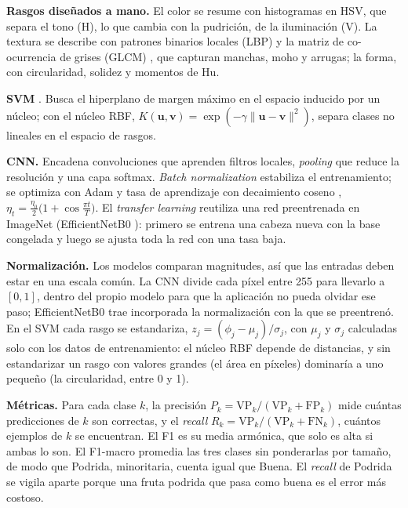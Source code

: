 \documentclass[conference,a4paper]{IEEEtran}
\begin{document}
\textbf{Rasgos diseñados a mano.} El color se resume con histogramas en HSV, que separa el tono (H),
lo que cambia con la pudrición, de la iluminación (V). La textura se describe con patrones binarios
locales (LBP) \cite{ojala2002} y la matriz de co-ocurrencia de grises (GLCM) \cite{haralick1973}, que
capturan manchas, moho y arrugas; la forma, con circularidad, solidez y momentos de Hu.

\textbf{SVM} \cite{cortes1995}. Busca el hiperplano de margen máximo en el espacio inducido por un
núcleo; con el núcleo RBF, $K(\mathbf{u},\mathbf{v})=\exp(-\gamma\lVert\mathbf{u}-\mathbf{v}\rVert^2)$,
separa clases no lineales en el espacio de rasgos.

\textbf{CNN.} Encadena convoluciones que aprenden filtros locales, \emph{pooling} que reduce la
resolución y una capa softmax. \emph{Batch normalization} \cite{ioffe2015} estabiliza el
entrenamiento; se optimiza con Adam \cite{kingma2015} y tasa de aprendizaje con decaimiento coseno
\cite{loshchilov2017}, $\eta_t=\tfrac{\eta_0}{2}\bigl(1+\cos\tfrac{\pi t}{T}\bigr)$.
El \emph{transfer learning} reutiliza una red preentrenada en ImageNet (EfficientNetB0
\cite{tan2019}): primero se entrena una cabeza nueva con la base congelada y luego se ajusta toda la
red con una tasa baja.

\textbf{Normalización.} Los modelos comparan magnitudes, así que las entradas deben estar en una
escala común. La CNN divide cada píxel entre 255 para llevarlo a $[0,1]$, dentro del propio modelo
para que la aplicación no pueda olvidar ese paso; EfficientNetB0 trae incorporada la normalización
con la que se preentrenó. En el SVM cada rasgo se estandariza, $z_j=(\phi_j-\mu_j)/\sigma_j$, con
$\mu_j$ y $\sigma_j$ calculadas solo con los datos de entrenamiento: el núcleo RBF depende de
distancias, y sin estandarizar un rasgo con valores grandes (el área en píxeles) dominaría a uno
pequeño (la circularidad, entre 0 y 1).

\textbf{Métricas.} Para cada clase $k$, la precisión $P_k=\mathrm{VP}_k/(\mathrm{VP}_k+\mathrm{FP}_k)$
mide cuántas predicciones de $k$ son correctas, y el \emph{recall}
$R_k=\mathrm{VP}_k/(\mathrm{VP}_k+\mathrm{FN}_k)$, cuántos ejemplos de $k$ se encuentran. El F1 es su
media armónica, que solo es alta si ambas lo son. El F1-macro promedia las tres clases sin
ponderarlas por tamaño, de modo que Podrida, minoritaria, cuenta igual que Buena. El \emph{recall}
de Podrida se vigila aparte porque una fruta podrida que pasa como buena es el error más costoso.
\end{document}
